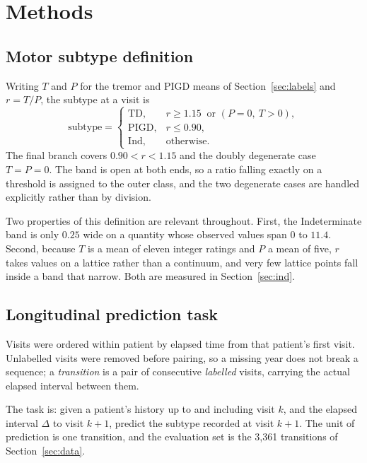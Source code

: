 \documentclass[11pt]{article}
\newcommand{\TD}{\mathrm{TD}}
\newcommand{\PIGD}{\mathrm{PIGD}}
\newcommand{\Ind}{\mathrm{Ind}}
\begin{document}
\section{Methods}

\subsection{Motor subtype definition}
\label{sec:rule}
Writing $T$ and $P$ for the tremor and PIGD means of Section~\ref{sec:labels}
and $r = T/P$, the subtype at a visit is
\begin{equation}
\mathrm{subtype} =
\begin{cases}
\TD,   & r \geq 1.15 \ \text{ or } (P = 0,\ T > 0),\\[2pt]
\PIGD, & r \leq 0.90,\\[2pt]
\Ind,  & \text{otherwise.}
\end{cases}
\label{eq:rule}
\end{equation}
The final branch covers $0.90 < r < 1.15$ and the doubly degenerate case
$T = P = 0$. The band is open at both ends, so a ratio falling exactly on a
threshold is assigned to the outer class, and the two degenerate cases are
handled explicitly rather than by division.

Two properties of this definition are relevant throughout. First, the
Indeterminate band is only $0.25$ wide on a quantity whose observed values span
$0$ to $11.4$. Second, because $T$ is a mean of eleven integer ratings and $P$ a
mean of five, $r$ takes values on a lattice rather than a continuum, and very
few lattice points fall inside a band that narrow. Both are measured in
Section~\ref{sec:ind}.

\subsection{Longitudinal prediction task}
\label{sec:task}
Visits were ordered within patient by elapsed time from that patient's first
visit. Unlabelled visits were removed before pairing, so a missing year does not
break a sequence; a \emph{transition} is a pair of consecutive \emph{labelled}
visits, carrying the actual elapsed interval between them.

The task is: given a patient's history up to and including visit $k$, and the
elapsed interval $\Delta$ to visit $k+1$, predict the subtype recorded at visit
$k+1$. The unit of prediction is one transition, and the evaluation set is the
3,361 transitions of Section~\ref{sec:data}.
\end{document}
